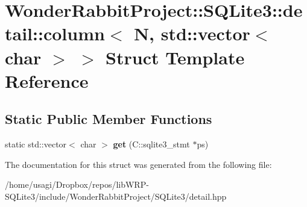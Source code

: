 \hypertarget{structWonderRabbitProject_1_1SQLite3_1_1detail_1_1column_3_01N_00_01std_1_1vector_3_01char_01_4_01_4}{\section{Wonder\-Rabbit\-Project\-:\-:S\-Q\-Lite3\-:\-:detail\-:\-:column$<$ N, std\-:\-:vector$<$ char $>$ $>$ Struct Template Reference}
\label{structWonderRabbitProject_1_1SQLite3_1_1detail_1_1column_3_01N_00_01std_1_1vector_3_01char_01_4_01_4}
}
\subsection*{Static Public Member Functions}
\begin{DoxyCompactItemize}
\item 
\hypertarget{structWonderRabbitProject_1_1SQLite3_1_1detail_1_1column_3_01N_00_01std_1_1vector_3_01char_01_4_01_4_ae8f444d27a5f72bfa1378e5a320a8a1c}{static std\-::vector$<$ char $>$ {\bfseries get} (C\-::sqlite3\-\_\-stmt $\ast$ps)}\label{structWonderRabbitProject_1_1SQLite3_1_1detail_1_1column_3_01N_00_01std_1_1vector_3_01char_01_4_01_4_ae8f444d27a5f72bfa1378e5a320a8a1c}

\end{DoxyCompactItemize}


The documentation for this struct was generated from the following file\-:\begin{DoxyCompactItemize}
\item 
/home/usagi/\-Dropbox/repos/lib\-W\-R\-P-\/\-S\-Q\-Lite3/include/\-Wonder\-Rabbit\-Project/\-S\-Q\-Lite3/detail.\-hpp\end{DoxyCompactItemize}
